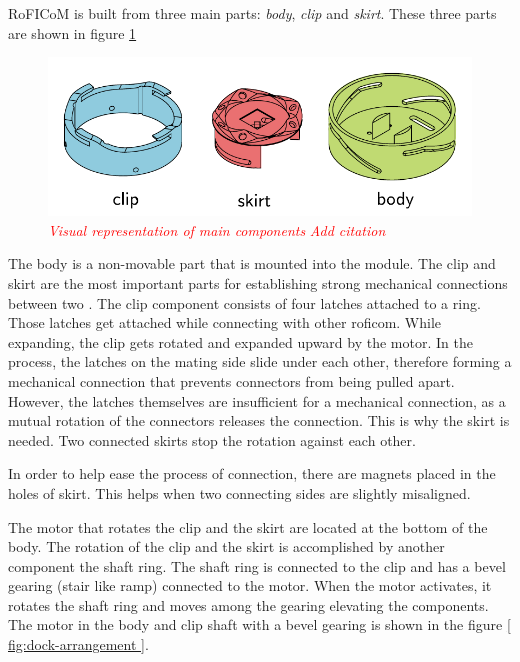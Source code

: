 \documentclass[
  digital,     %
  oneside,     %
  nosansbold,  %
  nocolorbold, %
  lof,         %
  lot,         %
]{fithesis4}
\newcommand{\TODO}[1]{\textcolor{red}{\textit{#1}}}
\begin{document}
RoFICoM is built from three main parts: \emph{body}, \emph{clip} and \emph{skirt}. These three parts are shown in figure \ref{ fig:key-components }

\begin{figure}
    \includegraphics{ dock_key_components.pdf }
    \caption{ \TODO{ Visual representation of main components } \TODO{Add citation} }
    \label{ fig:key-components }
\end{figure}

The body is a non-movable part that is mounted into the module.
The clip and skirt are the most important parts for establishing strong mechanical connections between two .
The clip component consists of four latches attached to a ring. Those latches get attached while connecting with
other \acrshort{roficom}. While expanding, the clip gets rotated and expanded upward by the motor. In the process, the latches on the mating
side slide under each other, therefore forming a mechanical connection that prevents connectors from being pulled apart.
However, the latches themselves are insufficient for a mechanical connection, as a mutual rotation of the connectors releases
the connection. This is why the skirt is needed. Two connected skirts stop the rotation against each other.

In order to help ease the process of connection, there are magnets placed in the holes of skirt. This helps when two connecting sides are slightly misaligned.

The motor that rotates the clip and the skirt are located at the bottom of the body. The rotation of the clip and the skirt is accomplished by another component the shaft ring. The shaft ring is connected to the clip and has a bevel gearing (stair like ramp) connected to the motor. When the motor activates, it rotates the shaft ring and moves among the gearing elevating the components. The motor in the body and clip shaft with a bevel gearing is shown in the figure \ref{ fig:dock-arrangement }.
\end{document}
